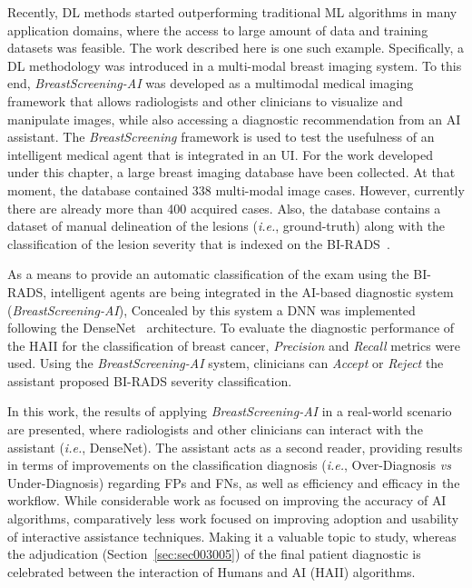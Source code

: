 Recently, \ac{DL} methods started outperforming traditional \ac{ML} algorithms in many application domains, where the access to large amount of data and training datasets was feasible.
The work described here is one such example. Specifically, a \ac{DL} methodology was introduced in a multi-modal breast imaging system.
To this end, {\it BreastScreening-AI} was developed as a multimodal medical imaging framework that allows radiologists and other clinicians to visualize and manipulate images, while also accessing a diagnostic recommendation from an \ac{AI} assistant.
The {\it BreastScreening} framework is used to test the usefulness of an intelligent medical agent that is integrated in an \ac{UI}.
For the work developed under this chapter, a large breast imaging database have been collected.
At that moment, the database contained 338 multi-modal image cases.
However, currently there are already more than 400 acquired cases.
Also, the database contains a dataset of manual delineation of the lesions ({\it i.e.}, ground-truth)
along with the classification of the lesion severity that is indexed on the \ac{BI-RADS}~\cite{ghosh2019artificial}.

As a means to provide an automatic classification of the exam using the \ac{BI-RADS}, intelligent agents are being integrated in the \ac{AI}-based diagnostic system ({\it BreastScreening-AI}),
Concealed by this system a \ac{DNN} was implemented following the DenseNet~\cite{chen2019learning} architecture.
To evaluate the diagnostic performance of the \ac{HAII} for the classification of breast cancer, {\it Precision} and  {\it Recall} metrics were used.
Using the {\it BreastScreening-AI} system, clinicians can {\it Accept} or {\it Reject} the assistant proposed \ac{BI-RADS} severity classification.

In this work, the results of applying {\it BreastScreening-AI} in a real-world scenario are presented, where radiologists and other clinicians can interact with the assistant ({\it i.e.}, DenseNet).
The assistant acts as a second reader, providing results in terms of improvements on the classification diagnosis ({\it i.e.}, Over-Diagnosis {\it vs} Under-Diagnosis) regarding \acp{FP} and \acp{FN}, as well as efficiency and efficacy in the workflow.
While considerable work as focused on improving the accuracy of \ac{AI} algorithms, comparatively less work focused on improving adoption and usability of interactive assistance techniques.
Making it a valuable topic to study, whereas the adjudication (Section~\ref{sec:sec003005}) of the final patient diagnostic is celebrated between the interaction of Humans and \ac{AI} (\ac{HAII}) algorithms.

